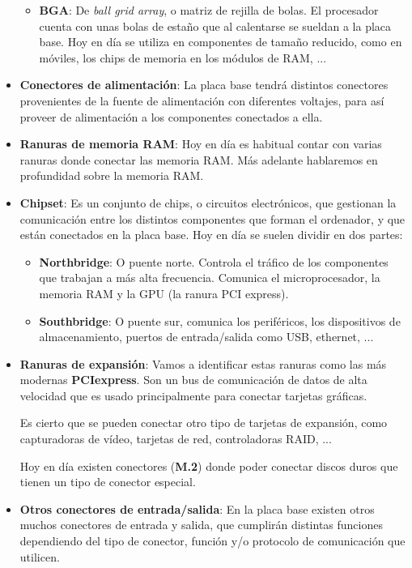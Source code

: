 \begin{itemize}
\begin{itemize}
        \item \textbf{BGA}: De \textit{ball grid array}, o matriz de rejilla de bolas. El procesador cuenta con unas bolas de estaño que al calentarse se sueldan a la placa base. Hoy en día se utiliza en componentes de tamaño reducido, como en móviles, los chips de memoria en los módulos de RAM, ...
    \end{itemize}

    \item \textbf{Conectores de alimentación}: La placa base tendrá distintos conectores provenientes de la fuente de alimentación con diferentes voltajes, para así proveer de alimentación a los componentes conectados a ella.

    \item \textbf{Ranuras de memoria RAM}: Hoy en día es habitual contar con varias ranuras donde conectar las memoria RAM. Más adelante hablaremos en profundidad sobre la memoria RAM.

    \item \textbf{Chipset}: Es un conjunto de chips, o circuitos electrónicos, que gestionan la comunicación entre los distintos componentes que forman el ordenador, y que están conectados en la placa base. Hoy en día se suelen dividir en dos partes:
    \begin{itemize}
        \item \textbf{Northbridge}: O puente norte. Controla el tráfico de los componentes que trabajan a más alta frecuencia. Comunica el microprocesador, la memoria RAM y la GPU (la ranura PCI express).
        \item \textbf{Southbridge}: O puente sur, comunica los periféricos, los dispositivos de almacenamiento, puertos de entrada/salida como USB, ethernet, ...
    \end{itemize}

    \item \textbf{Ranuras de expansión}: Vamos a identificar estas ranuras como las más modernas  \textbf{PCIexpress}. Son un bus de comunicación de datos de alta velocidad que es usado principalmente para conectar tarjetas gráficas.

    Es cierto que se pueden conectar otro tipo de tarjetas de expansión, como capturadoras de vídeo, tarjetas de red, controladoras RAID, ...

    Hoy en día existen conectores (\textbf{M.2}) donde poder conectar discos duros que tienen un tipo de conector especial.

    \item \textbf{Otros conectores de entrada/salida}: En la placa base existen otros muchos conectores de entrada y salida, que cumplirán distintas funciones dependiendo del tipo de conector, función y/o protocolo de comunicación que utilicen.


\end{itemize}
